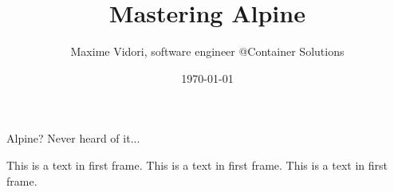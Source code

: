 \documentclass{beamer}
\title{Mastering Alpine}
\author{Maxime Vidori, software engineer @Container Solutions}
\date{\today}
\begin{document}
\frame{\titlepage}
\begin{frame}{Alpine? Never heard of it...}

This is a text in first frame. This is a text in first frame. This is a text in first frame.
\end{frame}
\end{document}
